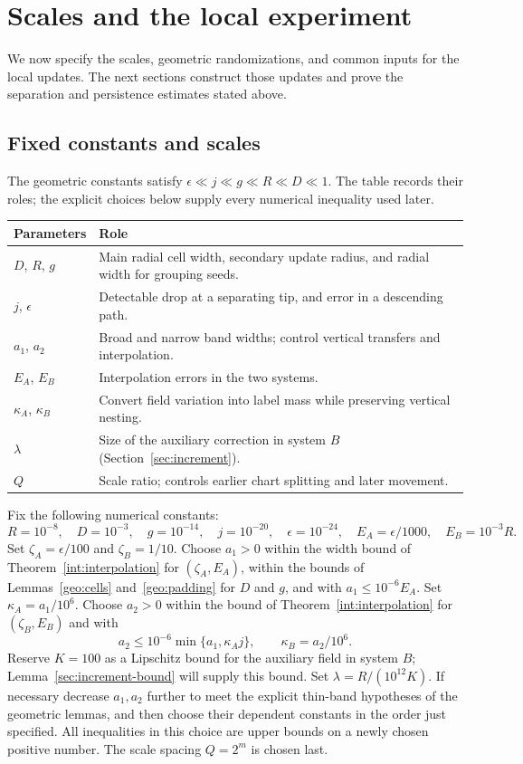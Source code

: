 \section{Scales and the local experiment}
\label{scale:section}

We now specify the scales, geometric randomizations, and common inputs
for the local updates. The next sections construct those updates and
prove the separation and persistence estimates stated above.

\subsection{Fixed constants and scales}\label{sets:parameters}
The geometric constants satisfy
$\epsilon\ll j\ll g\ll R\ll D\ll1$. The table records their roles;
the explicit choices below supply every numerical inequality used later.

\begin{center}
\renewcommand{\arraystretch}{1.12}
\begin{tabular}{@{}p{}p{}@{}}
\toprule
Parameters & Role \\
\midrule
$D$, $R$, $g$ & Main radial cell width, secondary update radius, and radial width for grouping seeds. \\
$j$, $\epsilon$ & Detectable drop at a separating tip, and error in a descending path. \\
$a_1$, $a_2$ & Broad and narrow band widths; control vertical transfers and interpolation. \\
$E_A$, $E_B$ & Interpolation errors in the two systems. \\
$\kappa_A$, $\kappa_B$ & Convert field variation into label mass while preserving vertical nesting. \\
$\lambda$ & Size of the auxiliary correction in system $B$ (Section~\ref{sec:increment}). \\
$Q$ & Scale ratio; controls earlier chart splitting and later movement. \\
\bottomrule
\end{tabular}
\end{center}

Fix the following numerical constants:
\[
 R=10^{-8},\quad D=10^{-3},\quad g=10^{-14},\quad
 j=10^{-20},\quad \epsilon=10^{-24},\quad
 E_A=\epsilon/1000,\quad E_B=10^{-3}R.
\]
Set $\zeta_A=\epsilon/100$ and $\zeta_B=1/10$. Choose $a_1>0$ within the
width bound of Theorem~\ref{int:interpolation} for $(\zeta_A,E_A)$, within the bounds of Lemmas~\ref{geo:cells} and~\ref{geo:padding} for $D$ and $g$, and with $a_1\le10^{-6}E_A$.
Set $\kappa_A=a_1/10^6$. Choose $a_2>0$ within the bound of Theorem~\ref{int:interpolation} for
$(\zeta_B,E_B)$ and with
\[
 a_2\le10^{-6}\min\{a_1,\kappa_Aj\},
 \qquad \kappa_B=a_2/10^6.
\]
Reserve $K=100$ as a Lipschitz bound for the auxiliary field in system
$B$; Lemma~\ref{sec:increment-bound} will supply this bound. Set
$\lambda=R/(10^{12}K)$. If necessary decrease $a_1,a_2$ further to meet the
explicit thin-band hypotheses of the geometric lemmas, and then choose
their dependent constants in the order just specified. All inequalities
in this choice are upper bounds on a newly chosen positive number.
The scale spacing $Q=2^m$ is chosen last.

